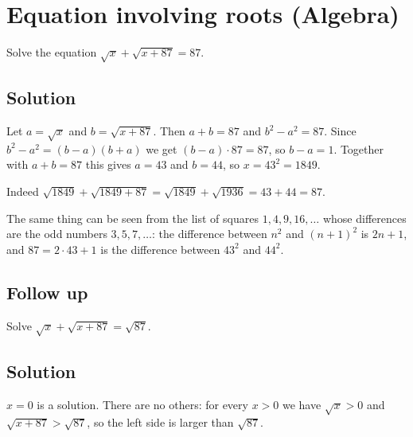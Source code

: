 \section {Equation involving roots (Algebra)}

Solve the equation $\sqrt{x} + \sqrt{x+87} = 87$.

\subsection{Solution}

Let $a = \sqrt{x}$ and $b = \sqrt{x+87}$. Then $a+b = 87$ and $b^2 - a^2 = 87$.
Since $b^2-a^2 = (b-a)(b+a)$ we get $(b-a) \cdot 87 = 87$, so $b-a = 1$.
Together with $a+b=87$ this gives $a=43$ and $b=44$, so $x = 43^2 = 1849$.

Indeed $\sqrt{1849} + \sqrt{1849+87} = \sqrt{1849} + \sqrt{1936} = 43 + 44 = 87$.

The same thing can be seen from the list of squares $1, 4, 9, 16, \ldots$ whose differences are the odd numbers $3, 5, 7, \ldots$:
the difference between $n^2$ and $(n+1)^2$ is $2n+1$, and $87 = 2 \cdot 43 + 1$ is the difference between $43^2$ and $44^2$.

\subsection{Follow up}
Solve $\sqrt{x} + \sqrt{x+87} = \sqrt{87}$.

\subsection{Solution}
$x=0$ is a solution. There are no others: for every $x > 0$ we have $\sqrt{x} > 0$ and $\sqrt{x+87} > \sqrt{87}$,
so the left side is larger than $\sqrt{87}$.
